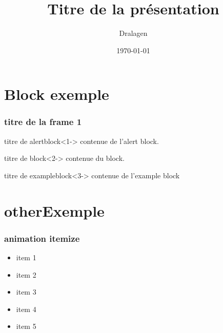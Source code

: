 \documentclass[12pt]{beamer}
\title{Titre de la présentation}
\author{Dralagen}
\date{\today}
\begin{document}
\begin{frame}
	\maketitle
\end{frame}

\begin{frame}
	\tableofcontents
\end{frame}

\section{Block exemple}
\begin{frame}
  \frametitle{titre de la frame 1}


  \begin{alertblock}{titre de alertblock}<1->
    contenue de l'alert block.
  \end{alertblock}
  \begin{block}{titre de block}<2->
     contenue du block.
  \end{block}
  \begin{exampleblock}{titre de exampleblock}<3->
    contenue de l'example block
  \end{exampleblock}
\end{frame}

\section{otherExemple}
\begin{frame}
  \frametitle{animation itemize}
  \begin{itemize}[<+->]
    \item item 1
    \item item 2
    \item item 3
    \item<3-> item 4
    \item item 5
  \end{itemize}
\end{frame}
\end{document}
